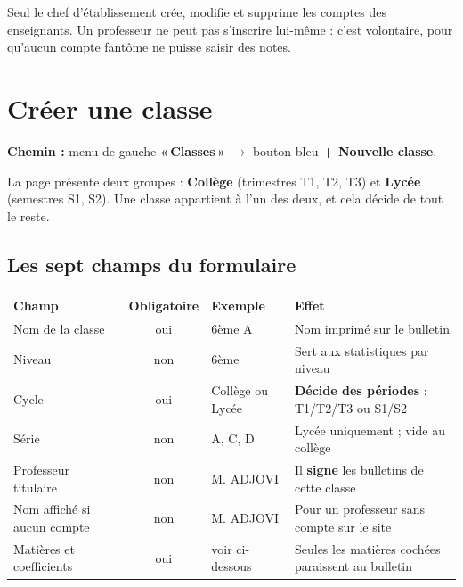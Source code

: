 \documentclass[11pt,a4paper]{article}
\newcommand{\menu}[1]{\textbf{«\,#1\,»}}
\newcommand{\bouton}[1]{\textbf{#1}}
\begin{document}
\begin{boitecle}
Seul le chef d'établissement crée, modifie et supprime les comptes des
enseignants. Un professeur ne peut pas s'inscrire lui-même : c'est volontaire,
pour qu'aucun compte fantôme ne puisse saisir des notes.
\end{boitecle}

\newpage

\section{Créer une classe}

\textbf{Chemin :} menu de gauche \menu{Classes} $\rightarrow$ bouton bleu
\bouton{+ Nouvelle classe}.

La page présente deux groupes : \textbf{Collège} (trimestres T1, T2, T3) et
\textbf{Lycée} (semestres S1, S2). Une classe appartient à l'un des deux, et cela
décide de tout le reste.

\subsection{Les sept champs du formulaire}

\begin{center}
\renewcommand{\arraystretch}{1.25}
\begin{tabularx}{\textwidth}{@{} >{\raggedright}p{3.5cm} c >{\raggedright}p{3.4cm} X@{}}
\toprule
\textbf{Champ} & \textbf{Obligatoire} & \textbf{Exemple} & \textbf{Effet} \\
\midrule
Nom de la classe & oui & 6ème A & Nom imprimé sur le bulletin \\
Niveau & non & 6ème & Sert aux statistiques par niveau \\
Cycle & oui & Collège ou Lycée & \textbf{Décide des périodes} : T1/T2/T3 ou S1/S2 \\
Série & non & A, C, D & Lycée uniquement ; vide au collège \\
Professeur titulaire & non & M. ADJOVI & Il \textbf{signe} les bulletins de cette classe \\
Nom affiché si aucun compte & non & M. ADJOVI & Pour un professeur sans compte sur le site \\
Matières et coefficients & oui & voir ci-dessous & Seules les matières cochées paraissent au bulletin \\
\bottomrule
\end{tabularx}
\end{center}
\end{document}
